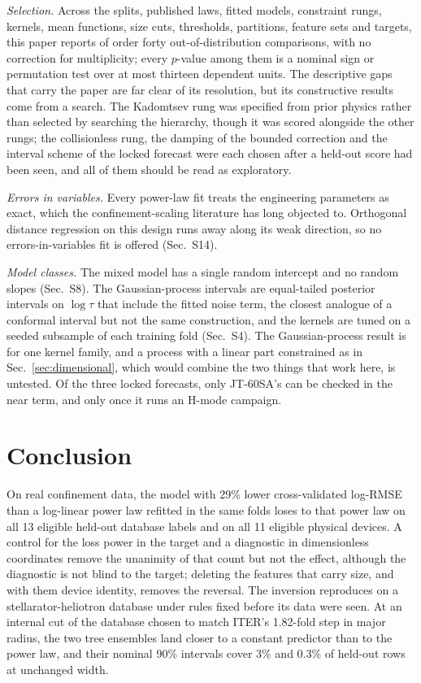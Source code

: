 \documentclass[aip,pop,preprint,amsmath,amssymb]{revtex4-2}
\begin{document}
\emph{Selection.} Across the splits, published laws, fitted models, constraint
rungs, kernels, mean functions, size cuts, thresholds, partitions, feature sets
and targets, this paper reports of order forty out-of-distribution comparisons,
with no correction for multiplicity; every $p$-value among them is a nominal
sign or permutation test over at most thirteen dependent units. The descriptive gaps that carry the paper are
far clear of its resolution, but its constructive results come from a search.
The Kadomtsev rung was specified from prior physics rather than selected by
searching the hierarchy, though it was scored alongside the other rungs; the
collisionless rung, the damping of the bounded correction and the interval
scheme of the locked forecast were each chosen after a held-out score had been
seen, and all of them should be read as exploratory.

\emph{Errors in variables.} Every power-law fit treats the engineering
parameters as exact, which the confinement-scaling literature has long objected
to\cite{kardaun,cordey,gls}. Orthogonal distance regression on this design runs
away along its weak direction, so no errors-in-variables fit is offered
(Sec.~S14).

\emph{Model classes.} The mixed model has a single random intercept and no
random slopes (Sec.~S8). The Gaussian-process intervals are equal-tailed
posterior intervals on $\log\tau$ that include the fitted noise term, the
closest analogue of a conformal interval but not the same construction, and the
kernels are tuned on a seeded subsample of each training fold (Sec.~S4). The
Gaussian-process result is for one kernel family,
and a process with a linear part constrained as in Sec.~\ref{sec:dimensional},
which would combine the two things that work here, is untested. Of the three locked forecasts, only JT-60SA's can be checked in the near term,
and only once it runs an H-mode campaign.

\section{Conclusion}

On real confinement data, the model with 29\% lower cross-validated log-RMSE
than a log-linear power law refitted in the same folds loses to that power law
on all
13 eligible held-out database labels and on all 11 eligible physical devices.
A control for the loss power in the target and a diagnostic in dimensionless
coordinates remove the unanimity of that count but not the effect, although
the diagnostic is not blind to the target; deleting the features that carry
size, and with them device identity, removes the reversal.
The inversion reproduces on a stellarator-heliotron database under rules fixed
before its data were seen.
At an internal cut of the database chosen to match ITER's 1.82-fold step in
major radius, the two tree ensembles land closer to a constant predictor than
to the power law, and their nominal 90\% intervals cover 3\% and 0.3\% of
held-out rows at unchanged width.
\end{document}
